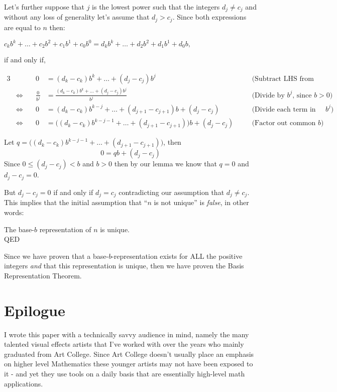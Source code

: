 \documentclass{article}
\begin{document}
Let's further suppose that $j$ is the lowest power such that the integers $d_j\ne{}c_j$ and without any loss of generality
let's assume that $d_j>c_j$. Since both expressions are equal to $n$ then:
\begin{center}
$c_kb^k+\dots+c_2b^2+c_1b^1+c_0b^0=d_kb^k+\dots+d_2b^2+d_1b^1+d_0b,$

\smallskip
if and only if,
\end{center}
{\small
\begin{alignat*}{3}
  &&0
  &= (d_k-c_k)b^k+\dots+(d_j-c_j)b^j&&\quad\text{(Subtract LHS from both sides)}\\
  &\Leftrightarrow\quad
  &\frac{0}{b^j}
  &= \frac{(d_k-c_k)b^k+\dots+(d_j-c_j)b^j}{b^j} &&\quad\text{(Divide by }b^j\text{, since }b>0\text{)}\\
  &\Leftrightarrow\quad
  &0
  &=(d_k-c_k)b^{k-j}+\dots+(d_{j+1}-c_{j+1})b+(d_j-c_j) &&\quad\text{(Divide each term in numerator by }b^j{)}\\
  &\Leftrightarrow\quad
  &0
  &= \big((d_k-c_k)b^{k-j-1}+\dots+(d_{j+1}-c_{j+1})\big)b+(d_j-c_j) &&\quad\text{(Factor out common }b{)}
\end{alignat*}
}

Let $q=\big((d_k-c_k)b^{k-j-1}+\dots+(d_{j+1}-c_{j+1})\big)$, then
\[0=qb+(d_j-c_j)\]
Since $0\le(d_j-c_j)<b$ and $b>0$ then by our lemma we know that
$q=0$ and $d_j-c_j = 0$.

But $d_j-c_j = 0$ if and only if $d_j = c_j$
contradicting our assumption that $d_j\ne{}c_j$. This implies that the initial assumption that ``$n$
is not unique'' is \emph{false}, in other words:
\begin{center}
The base-$b$ representation of $n$ is unique.\\
QED
\end{center}

\bigskip
Since we have proven that a base-$b$-representation exists for ALL the positive integers \emph{and}
that this representation is unique, then we
have proven the Basis Representation Theorem.

\break
\section*{Epilogue}

I wrote this paper with a technically savvy audience in mind, namely the many talented visual effects artists
that I've worked with over the years who mainly graduated from Art College. Since Art College doesn't
usually place an emphasis on higher level Mathematics these younger artists may not have been exposed to
it - and yet they use tools on a daily basis that are essentially high-level math applications.
\end{document}
